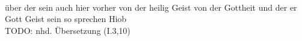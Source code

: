 \begin{exe}
\ex \label{ex:I1726} \gll {}                        \object{: } \\
{über} {der} {sein} {auch} {hier} {vorher} {von} {der} {heilig} {Geist} {} {von} {der} {Gottheit} {und} {der} {er} {Gott} {Geist} {sein} {} {so} {sprechen} {Hiob} {}\\
\glt TODO: nhd. Übersetzung (I.3,10)
\end{exe}
